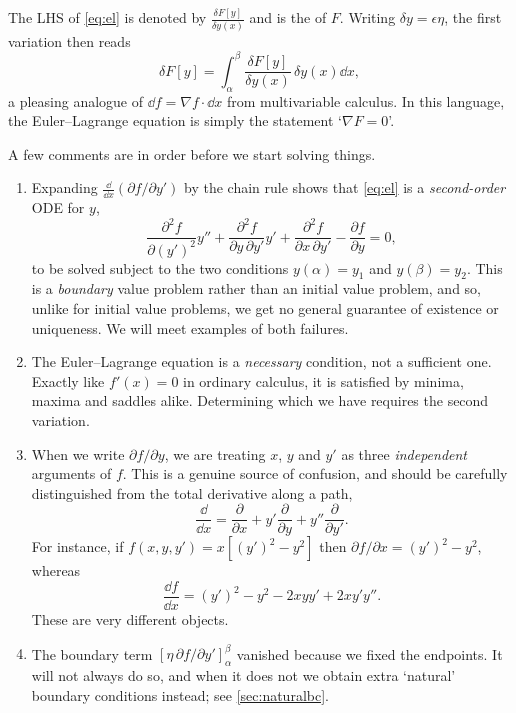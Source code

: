 \documentclass[a4paper]{scrartcl}
\begin{document}
\begin{notation}
	The LHS of \eqref{eq:el} is denoted by $\displaystyle\frac{\delta F[y]}{\delta y(x)}$ and is the  of $F$. Writing $\delta y = \epsilon\eta$, the first variation then reads
	$$
	\delta F[y] = \int_\alpha^\beta \frac{\delta F[y]}{\delta y(x)}\,\delta y(x) \dd x,
	$$
	a pleasing analogue of $\dd f = \nabla f \cdot \dd x$ from multivariable calculus. In this language, the Euler--Lagrange equation is simply the statement `$\nabla F = 0$'.
\end{notation}

A few comments are in order before we start solving things.

\begin{remark}\leavevmode
	\begin{enumerate}[label=(\roman*)]
		\item Expanding $\frac{\dd}{\dd x}\left(\partial f/\partial y'\right)$ by the chain rule shows that \eqref{eq:el} is a \emph{second-order} ODE for $y$,
		$$
		\frac{\partial^2 f}{\partial (y')^2}y'' + \frac{\partial^2 f}{\partial y\, \partial y'}y' + \frac{\partial^2 f}{\partial x\, \partial y'} - \frac{\partial f}{\partial y} = 0,
		$$
		to be solved subject to the two conditions $y(\alpha) = y_1$ and $y(\beta) = y_2$. This is a \emph{boundary} value problem rather than an initial value problem, and so, unlike for initial value problems, we get no general guarantee of existence or uniqueness. We will meet examples of both failures.
		\item The Euler--Lagrange equation is a \emph{necessary} condition, not a sufficient one. Exactly like $f'(x) = 0$ in ordinary calculus, it is satisfied by minima, maxima and saddles alike. Determining which we have requires the second variation.
		\item When we write $\partial f/\partial y$, we are treating $x$, $y$ and $y'$ as three \emph{independent} arguments of $f$. This is a genuine source of confusion, and should be carefully distinguished from the total derivative along a path,
		$$
		\frac{\dd}{\dd x} = \frac{\partial}{\partial x} + y'\frac{\partial }{\partial y} + y''\frac{\partial}{\partial y'}.
		$$
		For instance, if $f(x, y, y') = x\left[(y')^2 - y^2\right]$ then $\partial f/\partial x = (y')^2 - y^2$, whereas
		$$
		\frac{\dd f}{\dd x} = (y')^2 - y^2 - 2xyy' + 2xy'y''.
		$$
		These are very different objects.
		\item The boundary term $\left[\eta\,\partial f/\partial y'\right]_\alpha^\beta$ vanished because we fixed the endpoints. It will not always do so, and when it does not we obtain extra `natural' boundary conditions instead; see \autoref{sec:naturalbc}.
	\end{enumerate}
\end{remark}
\end{document}
